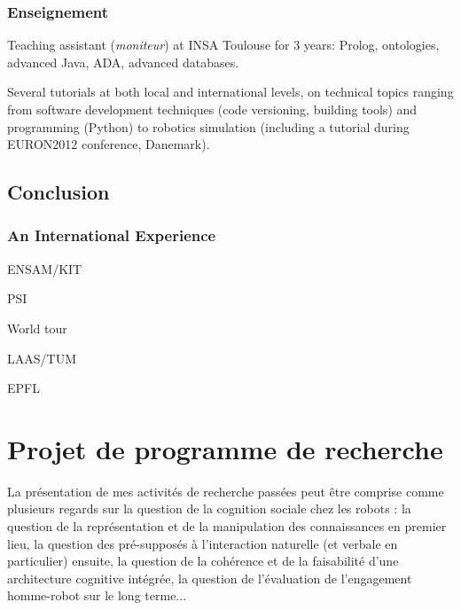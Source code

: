 \documentclass[a4paper]{article}
\begin{document}
\subsubsection{Enseignement}



Teaching assistant (\emph{moniteur}) at INSA Toulouse for 3 years: Prolog,
ontologies, advanced Java, ADA, advanced databases.

Several tutorials at both local and international levels, on technical topics
ranging from software development techniques (code versioning, building tools)
and programming (Python) to robotics simulation (including a tutorial during EURON2012 conference, Danemark).


\subsection{Conclusion%
  \label{conclusion}%
}


\subsubsection{An International Experience%
  \label{an-international-experience}%
}

ENSAM/KIT

PSI

World tour

LAAS/TUM

EPFL

\printbibliography



\section{Projet de programme de recherche}
\newrefsection

La présentation de mes activités de recherche passées peut être comprise comme
plusieurs regards sur la question de la cognition sociale chez les robots : la
question de la représentation et de la manipulation des connaissances en premier
lieu, la question des pré-supposés à l'interaction naturelle (et verbale en
particulier) ensuite, la question de la cohérence et de la faisabilité d'une
architecture cognitive intégrée, la question de l'évaluation de l'engagement
homme-robot sur le long terme...
\end{document}
